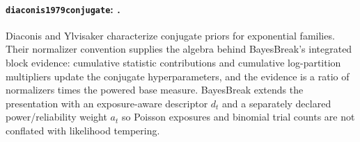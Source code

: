 
\paragraph{\texttt{diaconis1979conjugate}: \citet{diaconis1979conjugate}.}
Diaconis and Ylvisaker characterize conjugate priors for exponential families. Their normalizer convention supplies the algebra behind BayesBreak's integrated block evidence: cumulative statistic contributions and cumulative log-partition multipliers update the conjugate hyperparameters, and the evidence is a ratio of normalizers times the powered base measure. BayesBreak extends the presentation with an exposure-aware descriptor $d_t$ and a separately declared power/reliability weight $a_t$ so Poisson exposures and binomial trial counts are not conflated with likelihood tempering.
